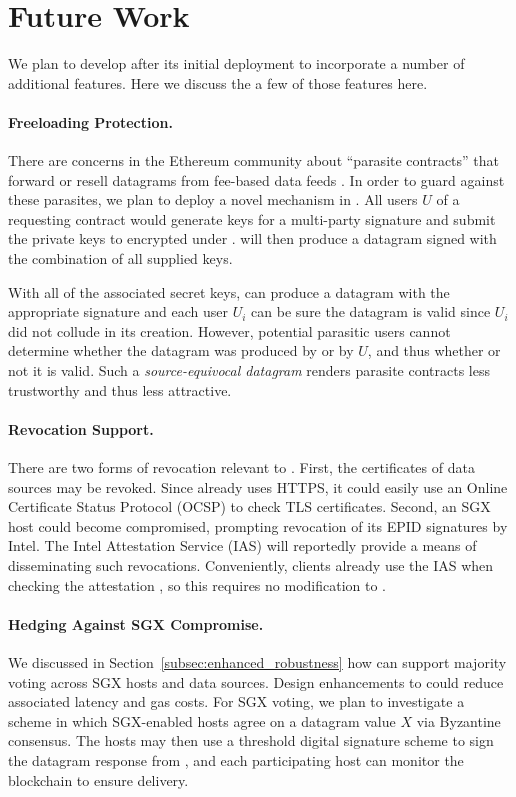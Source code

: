 \section{Future Work}
\label{sec:future-work}

We plan to develop \tc after its initial deployment to incorporate a number of additional features.
Here we discuss the a few of those features here.

\paragraph{Freeloading Protection.}
There are concerns in the Ethereum community about ``parasite contracts'' that forward or resell datagrams from fee-based data feeds \cite{parasite}.
In order to guard against these parasites, we plan to deploy a novel mechanism in \tc.
All users $U$ of a requesting contract would generate keys for a multi-party signature and submit the private keys to \tcont encrypted under \pkTC.
\tc will then produce a datagram signed with the combination of all supplied keys.

With all of the associated secret keys, \tcont can produce a datagram with the appropriate signature and each user $U_i$ can be sure the datagram is valid since $U_i$ did not collude in its creation.
However, potential parasitic users cannot determine whether the datagram was produced by \tcont or by $U$, and thus whether or not it is valid.
Such a \emph{source-equivocal datagram} renders parasite contracts less trustworthy and thus less attractive.

\paragraph{Revocation Support.}
There are two forms of revocation relevant to \tc.
First, the certificates of data sources may be revoked.
Since \tc already uses HTTPS, it could easily use an Online Certificate Status Protocol (OCSP) to check TLS certificates.
Second, an SGX host could become compromised, prompting revocation of its EPID signatures by Intel.
The Intel Attestation Service (IAS) will reportedly provide a means of disseminating such revocations.
Conveniently, clients already use the IAS when checking the attestation \sigatt, so this requires no modification to \tc.

\paragraph{Hedging Against SGX Compromise.}
We discussed in Section~\ref{subsec:enhanced_robustness} how \tc can support majority voting across SGX hosts and data sources.
Design enhancements to \tc could reduce associated latency and gas costs.
For SGX voting, we plan to investigate a scheme in which SGX-enabled \tc hosts agree on a datagram value $X$ via Byzantine consensus.
The hosts may then use a threshold digital signature scheme to sign the datagram response from \tcadd,
and each participating host can monitor the blockchain to ensure delivery.

